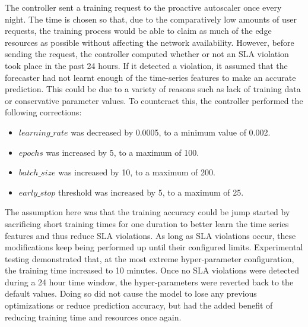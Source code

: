 The controller sent a training request to the proactive autoscaler once every night. The time is chosen so that, due to the comparatively low amounts of user requests, the training process would be able to claim as much of the edge resources as possible without affecting the network availability. However, before sending the request, the controller computed whether or not an SLA violation took place in the past 24 hours. If it detected a violation, it assumed that the forecaster had not learnt enough of the time-series features to make an accurate prediction. This could be due to a variety of reasons such as lack of training data or conservative parameter values. To counteract this, the controller performed the following corrections:

\begin{itemize}
    \item $learning\_rate$ was decreased by 0.0005, to a minimum value of 0.002.
    \item $epochs$ was increased by 5, to a maximum of 100.
    \item $batch\_size$ was increased by 10, to a maximum of 200.
    \item $early\_stop$ threshold was increased by 5, to a maximum of 25.
\end{itemize}

The assumption here was that the training accuracy could be jump started by sacrificing short training times for one duration to better learn the time series features and thus reduce SLA violations. As long as SLA violations occur, these modifications keep being performed up until their configured limits. Experimental testing demonstrated that, at the most extreme hyper-parameter configuration, the training time increased to 10 minutes. Once no SLA violations were detected during a 24 hour time window, the hyper-parameters were reverted back to the default values. Doing so did not cause the model to lose any previous optimizations or reduce prediction accuracy, but had the added benefit of reducing training time and resources once again.